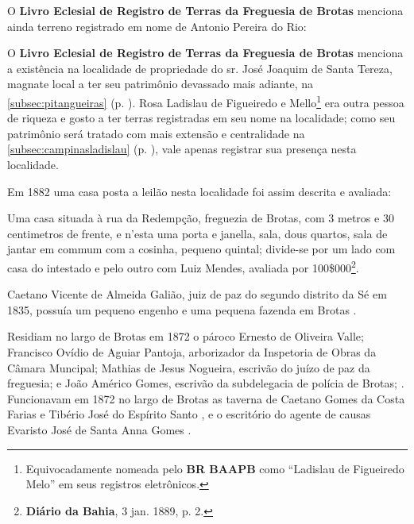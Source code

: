O \textbf{Livro Eclesial de Registro de Terras da Freguesia de Brotas} menciona ainda terreno registrado em nome de Antonio Pereira do Rio:



O \textbf{Livro Eclesial de Registro de Terras da Freguesia de Brotas} menciona a existência na localidade de propriedade do sr. José Joaquim de Santa Tereza, magnate local a ter seu patrimônio devassado mais adiante, na \autoref{subsec:pitangueiras} (p. \pageref{subsec:pitangueiras}). Rosa Ladislau de Figueiredo e Mello\footnote{Equivocadamente nomeada pelo \textbf{BR BAAPB} como ``Ladislau de Figueiredo Melo'' em seus registros eletrônicos.} era outra pessoa de riqueza e gosto a ter terras registradas em seu nome na localidade; como seu patrimônio será tratado com mais extensão e centralidade na \autoref{subsec:campinasladislau} (p. \pageref{subsec:campinasladislau}), vale apenas registrar sua presença nesta localidade.




Em 1882 uma casa posta a leilão nesta localidade foi assim descrita e avaliada:

\begin{citacao}
Uma casa situada à rua da Redempção, freguezia de Brotas, com 3 metros e 30 centimetros de frente, e n'esta uma porta e janella, sala, dous quartos, sala de jantar em commum com a cosinha, pequeno quintal; divide-se por um lado com casa do intestado e pelo outro com Luiz Mendes, avaliada por 100\$000\footnote{\textbf{Diário da Bahia}, 3 jan. 1889, p. 2.}.
\end{citacao}



Caetano Vicente de Almeida Galião, juiz de paz do segundo distrito da Sé em 1835, possuía um pequeno engenho e uma pequena fazenda em Brotas \cite[p.~239]{REIS2004males}.

Residiam no largo de Brotas em 1872 o pároco Ernesto de Oliveira Valle; Francisco Ovídio de Aguiar Pantoja, arborizador da Inspetoria de Obras da Câmara Muncipal; Mathias de Jesus Nogueira, escrivão do juízo de paz da freguesia; e João Américo Gomes, escrivão da subdelegacia de polícia de Brotas; \cite[segunda~parte, pp.~69, 87, 91, 132]{pimenta_almanak_1872}. Funcionavam em 1872 no largo de Brotas as taverna de Caetano Gomes da Costa Farias e Tibério José do Espírito Santo \cite[terceira~parte, pp.~40, 49]{pimenta_almanak_1872}, e o escritório do agente de causas Evaristo José de Santa Anna Gomes \cite[quarta~parte, pp.~6, 8]{pimenta_almanak_1872}.

